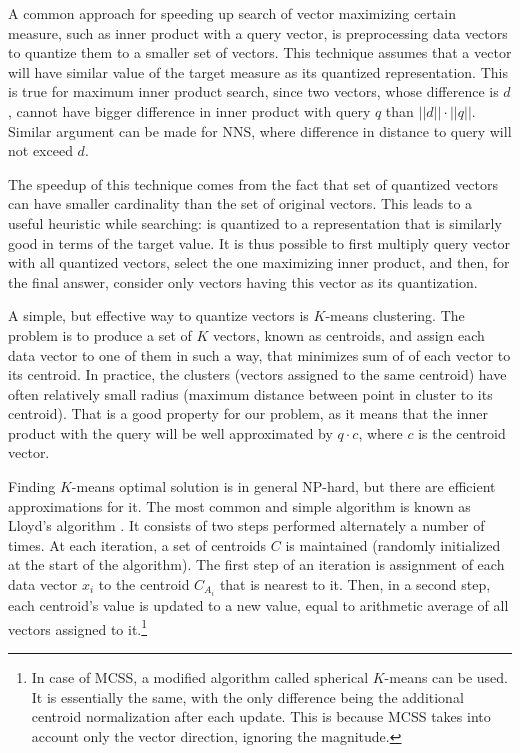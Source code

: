 
A common approach for speeding up search of vector maximizing certain measure,
such as inner product with a query vector, is preprocessing data vectors to
quantize  them to a smaller set of vectors. This technique assumes that a vector
will have similar value of the target measure as its quantized representation.
This is true for maximum inner product search, since two vectors,
whose difference is $d$, cannot have bigger difference in inner product with
query $q$ than $||d|| \cdot ||q||$. Similar argument can be made for NNS,
where difference in distance to query will not exceed $d$.

The speedup of this technique comes from the fact that set of quantized vectors
can have smaller cardinality than the set of original vectors. This leads to a 
useful heuristic while searching:  is quantized to a representation that is similarly
good in terms of the target value. It is thus possible to first multiply 
query vector with all quantized vectors, select the one maximizing inner
product, and then, for the final answer, consider only vectors having this vector
as its quantization.

A simple, but effective way to quantize vectors is $K$-means clustering.
The problem is to produce a set of $K$ vectors, known as centroids, and assign
each data vector to one of them in such a way, that minimizes sum of  of each vector to its centroid. In practice, the clusters (vectors
assigned to the same centroid) have often relatively small radius (maximum
distance between point in cluster to its centroid). That is a good property 
for our problem, as it means that the inner product with the query will be well approximated
by $q \cdot c$, where $c$ is the centroid vector.

Finding $K$-means optimal solution is in general NP-hard, but there are efficient
approximations for it. The most common and simple algorithm is known as 
Lloyd's algorithm . It consists of two steps performed alternately a number of
times. At each iteration, a set of centroids $C$ is maintained (randomly
initialized at the start of the algorithm). The first
step of an iteration is assignment of each data vector $x_i$ to the
centroid $C_{A_i}$ that
is nearest to it. Then, in a second step, each centroid's value is updated
to a new value, equal to arithmetic average of all vectors assigned to
it.\footnote{
In case of MCSS, a modified algorithm called spherical $K$-means can be used.
It is essentially the same, with the only difference being the additional
centroid normalization after each update. This is because MCSS
takes into account only the vector direction, ignoring the magnitude. 
}

